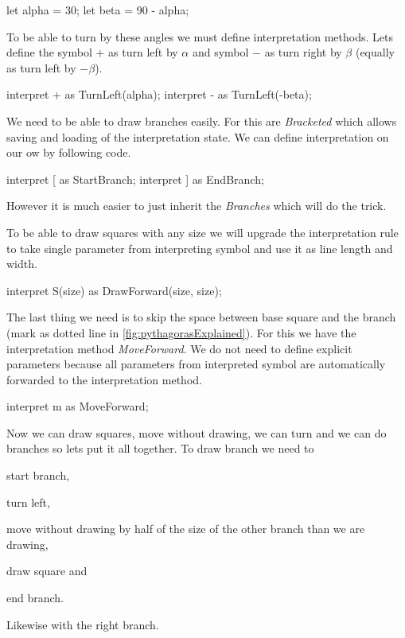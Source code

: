 \begin{Lsystem}
let alpha = 30;
let beta = 90 - alpha;
\end{Lsystem}

To be able to turn by these angles we must define interpretation methods.
Lets define the symbol $+$ as turn left by $\alpha$ and symbol $-$ as turn right by $\beta$ (equally as turn left by $-\beta$).

\begin{Lsystem}
interpret + as TurnLeft(alpha);
interpret - as TurnLeft(-beta);
\end{Lsystem}

We need to be able to draw branches easily.
For this are \emph{Bracketed \lsystems} which allows saving and loading of the interpretation state.
We can define interpretation on our ow by following code.

\begin{Lsystem}
interpret [ as StartBranch;
interpret ] as EndBranch;
\end{Lsystem}

However it is much easier to just inherit the \emph{Branches} \lsystem which will do the trick.

\begin{Lsystem}
lsystem PythagorasTree extends Branches {
\end{Lsystem}

To be able to draw squares with any size we will upgrade the interpretation rule to take single parameter from interpreting symbol and use it as line length and width.

\begin{Lsystem}
interpret S(size) as DrawForward(size, size);
\end{Lsystem}

The last thing we need is to skip the space between base square and the branch (mark as dotted line in \autoref{fig:pythagorasExplained}).
For this we have the interpretation method \emph{MoveForward}.
We do not need to define explicit parameters because all parameters from interpreted symbol are automatically forwarded to the interpretation method.

\begin{Lsystem}
interpret m as MoveForward;
\end{Lsystem}


Now we can draw squares, move without drawing, we can turn and we can do branches so lets put it all together.
To draw branch we need to
	\begin{inparaenum}[{\itshape a})]
		\item start branch,
		\item turn left,
		\item move without drawing by half of the size of the other branch than we are drawing,
		\item draw square and
		\item end branch.
	\end{inparaenum}
Likewise with the right branch.

